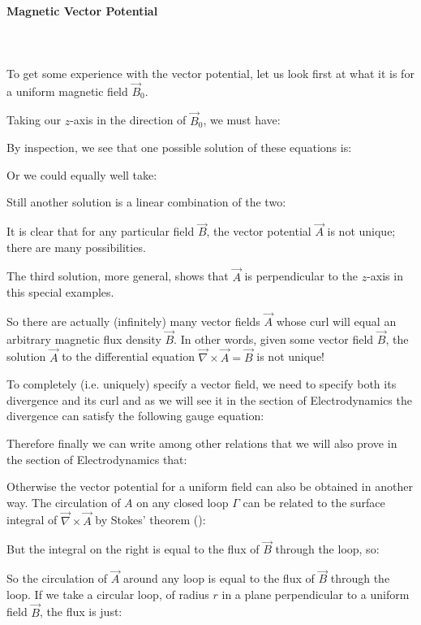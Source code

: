 	\pagebreak
	\paragraph{Magnetic Vector Potential}\label{magnetic vector potential}\mbox{}\\\\
	To get some experience with the vector potential, let us look first at what it is for a uniform magnetic field $\vec{B}_0$. 

	Taking our $z$-axis in the direction of $\vec{B}_0$, we must have:
	
	By inspection, we see that one possible solution of these equations is:
	
	Or we could equally well take:
	
	Still another solution is a linear combination of the two:
	
	It is clear that for any particular field $\vec{B}$, the vector potential $\vec{A}$ is not unique; there are many possibilities.
	
	The third solution, more general, shows that $\vec{A}$ is perpendicular to the $z$-axis in this special examples. 
	
	So there are actually (infinitely) many vector fields $\vec{A}$ whose curl will equal an arbitrary magnetic flux density $\vec{B}$. In other words, given some vector field $\vec{B}$, the solution $\vec{A}$ to the differential equation $\vec{\nabla}\times\vec{A}=\vec{B}$ is not unique!

	To completely (i.e. uniquely) specify a vector field, we need to specify both its divergence and its curl and as we will see it in the section of Electrodynamics the divergence can satisfy the following gauge equation:
	
	Therefore finally we can write among other relations that we will also prove in the section of Electrodynamics that:
	
	Otherwise the vector potential for a uniform field can also be obtained in another way. The circulation of $A$ on any closed loop $\Gamma$ can be related to the surface integral of $\vec{\nabla}\times\vec{A}$ by Stokes' theorem ():
	
	But the integral on the right is equal to the flux of $\vec{B}$ through the loop, so:
	
	So the circulation of $\vec{A}$ around any loop is equal to the flux of $\vec{B}$ through the loop. If we take a circular loop, of radius $r$ in a plane perpendicular to a uniform field $\vec{B}$, the flux is just:
	

